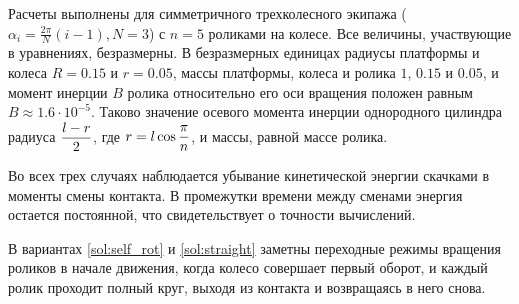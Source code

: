 Расчеты выполнены для симметричного трехколесного экипажа ($\alpha_i = \frac{2\pi}{N}(i - 1), N = 3$) с $n = 5$ роликами на колесе. Все величины, участвующие в уравнениях, безразмерны. В безразмерных единицах радиусы платформы и колеса $R = 0.15$ и $r = 0.05$, массы платформы, колеса и ролика $1$, $0.15$ и $0.05$, и момент инерции $B$ ролика относительно его оси вращения положен равным $B \approx 1.6 \cdot 10^{-5}$. Таково значение осевого момента инерции однородного цилиндра радиуса $\displaystyle\frac{\displaystyle l-r}{\displaystyle 2}$, где $r = l\cos\displaystyle\frac{\displaystyle \pi}{\displaystyle n}$, и массы, равной массе ролика.


Во всех трех случаях наблюдается убывание кинетической энергии скачками в моменты смены контакта. В промежутки времени между сменами энергия остается постоянной, что свидетельствует о точности вычислений.

В вариантах \ref{sol:self_rot} и \ref{sol:straight} заметны переходные режимы вращения роликов в начале движения, когда колесо совершает первый оборот, и каждый ролик проходит полный круг, выходя из контакта и возвращаясь в него снова.

